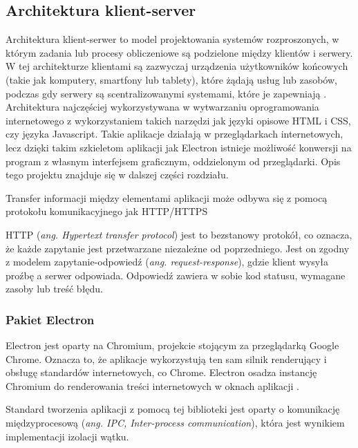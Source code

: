 \documentclass[12pt,a4paper,twoside]{article}
\begin{document}
\subsection{Architektura klient-server}
Architektura klient-serwer to model projektowania systemów rozproszonych, w którym zadania lub procesy obliczeniowe są podzielone między klientów i serwery. W tej architekturze klientami są zazwyczaj urządzenia użytkowników końcowych (takie jak komputery, smartfony lub tablety), które żądają usług lub zasobów, podczas gdy serwery są scentralizowanymi systemami, które je zapewniają \cite{client}. Architektura najczęściej wykorzystywana w wytwarzaniu oprogramowania internetowego z wykorzystaniem takich narzędzi jak języki opisowe HTML i CSS, czy języka Javascript. Takie aplikacje działają w przeglądarkach internetowych, lecz dzięki takim szkieletom aplikacji jak Electron istnieje możliwość konwersji na program z własnym interfejsem graficznym, oddzielonym od przeglądarki. Opis tego projektu znajduje się w dalszej części rozdziału.\par
Transfer informacji między elementami aplikacji może odbywa się z pomocą protokołu komunikacyjnego jak HTTP/HTTPS \par
HTTP (\textit{ang. Hypertext transfer protocol}) jest to bezstanowy protokół, co oznacza, że każde zapytanie jest przetwarzane niezależne od poprzedniego. Jest on zgodny z modelem zapytanie-odpowiedź (\textit{ang. request-response}), gdzie klient wysyła proźbę a serwer odpowiada. Odpowiedź zawiera w sobie kod statusu, wymagane zasoby lub treść błędu.\par
\subsubsection{Pakiet Electron}
Electron jest oparty na Chromium, projekcie stojącym za przeglądarką Google Chrome. Oznacza to, że aplikacje wykorzystują ten sam silnik renderujący i obsługę standardów internetowych, co Chrome. Electron osadza instancję Chromium do renderowania treści internetowych w oknach aplikacji \cite{electron}.\par
Standard tworzenia aplikacji z pomocą tej biblioteki jest oparty o komunikację międzyprocesową (\textit{ang. IPC, Inter-process communication}), która jest wynikiem implementacji izolacji wątku. 
\end{document}
